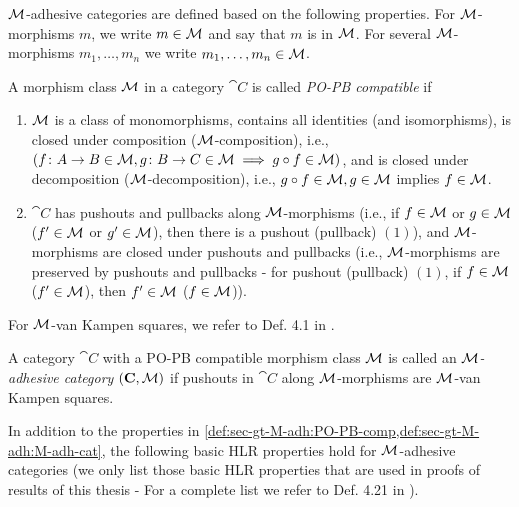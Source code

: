 ${\cal M}$-adhesive categories are defined based on the following properties.
For ${\cal M}$-morphisms $m$, we write $m \in {\cal M}$ and say that $m$ is in ${\cal M}$.
For several ${\cal M}$-morphisms $m_1,\ldots,m_n$ we write $m_1,\ldots,m_n \in {\cal M}$.

\begin{definition}
\label{def:sec-gt-M-adh:PO-PB-comp}
A morphism class ${\cal M}$ in a category $\cat{C}$ is called \emph{PO-PB compatible} if
\begin{enumerate}
  \item ${\cal M}$ is a class of monomorphisms, contains all identities (and isomorphisms), is closed under composition (${\cal M}$-composition), i.e., $(f\colon A \to B \in {\cal M},g\colon B \to C \in {\cal M} \implies g \circ f \in {\cal M})$, and is closed under decomposition (${\cal M}$-decomposition), i.e., $g \circ f \in {\cal M}, g \in {\cal M}$ implies $f \in {\cal M}$.
  \item $\cat{C}$ has pushouts and pullbacks along ${\cal M}$-morphisms (i.e., if $f \in {\cal M}$ or $g \in {\cal M}$ ($f' \in {\cal M}$ or $g' \in {\cal M}$), then there is a pushout (pullback) $(1)$), and ${\cal M}$-morphisms are closed under pushouts and pullbacks (i.e., ${\cal M}$-morphisms are preserved by pushouts and pullbacks - for pushout (pullback) $(1)$, if $f \in {\cal M}$ ($f' \in {\cal M}$), then $f' \in {\cal M}$ ($f \in {\cal M}$)).
\end{enumerate}
\envEndMarker
\end{definition}

For ${\cal M}$-van Kampen squares, we refer to Def. 4.1 in \cite{FAGT2}.

\begin{definition}
\label{def:sec-gt-M-adh:M-adh-cat}
A category $\cat{C}$ with a PO-PB compatible morphism class ${\cal M}$ is called an \emph{${\cal M}$-adhesive category $(\mathbf{C},{\cal M})$} if pushouts in $\cat{C}$ along ${\cal M}$-morphisms are ${\cal M}$-van Kampen squares.
\envEndMarker
\end{definition}

In addition to the properties in \cref{def:sec-gt-M-adh:PO-PB-comp,def:sec-gt-M-adh:M-adh-cat}, the following basic HLR properties hold for ${\cal M}$-adhesive categories (we only list those basic HLR properties that are used in proofs of results of this thesis - For a complete list we refer to Def. 4.21 in \cite{FAGT2}).

